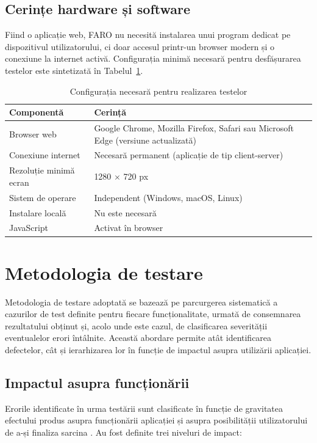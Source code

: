 \documentclass[12pt,a4paper,oneside]{report}
\begin{document}
\subsection{Cerințe hardware și software}

Fiind o aplicație web, FARO nu necesită instalarea unui program dedicat pe dispozitivul utilizatorului, ci doar accesul printr-un browser modern și o conexiune la internet activă. Configurația minimă necesară pentru desfășurarea testelor este sintetizată în Tabelul~\ref{tab:config-testare}.

\begin{table}[H]
\centering
\caption{Configurația necesară pentru realizarea testelor}
\label{tab:config-testare}
\begin{tabularx}{\textwidth}{|l|X|}
\hline
\textbf{Componentă} & \textbf{Cerință} \\
\hline
Browser web & Google Chrome, Mozilla Firefox, Safari sau Microsoft Edge (versiune actualizată) \\
\hline
Conexiune internet & Necesară permanent (aplicație de tip client-server) \\
\hline
Rezoluție minimă ecran & 1280 $\times$ 720 px \\
\hline
Sistem de operare & Independent (Windows, macOS, Linux) \\
\hline
Instalare locală & Nu este necesară \\
\hline
JavaScript & Activat în browser \\
\hline
\end{tabularx}
\end{table}

\section{Metodologia de testare}

Metodologia de testare adoptată se bazează pe parcurgerea sistematică a cazurilor de test definite pentru fiecare funcționalitate, urmată de consemnarea rezultatului obținut și, acolo unde este cazul, de clasificarea severității eventualelor erori întâlnite. Această abordare permite atât identificarea defectelor, cât și ierarhizarea lor în funcție de impactul asupra utilizării aplicației.

\subsection{Impactul asupra funcționării}

Erorile identificate în urma testării sunt clasificate în funcție de gravitatea efectului produs asupra funcționării aplicației și asupra posibilității utilizatorului de a-și finaliza sarcina \cite{ref:testing}. Au fost definite trei niveluri de impact:
\end{document}
